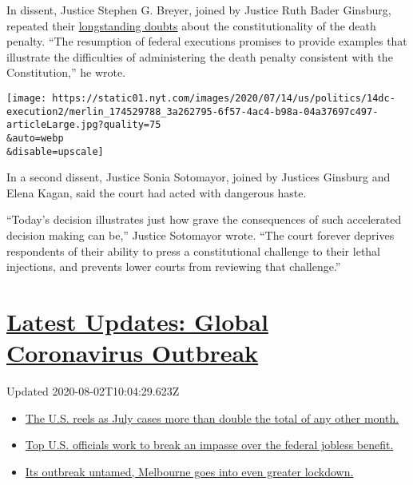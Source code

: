 In dissent, Justice Stephen G. Breyer, joined by Justice Ruth Bader
Ginsburg, repeated their
\href{https://www.nytimes.com/2015/11/04/us/politics/death-penalty-opponents-split-over-taking-issue-to-supreme-court.html}{longstanding
doubts} about the constitutionality of the death penalty. ``The
resumption of federal executions promises to provide examples that
illustrate the difficulties of administering the death penalty
consistent with the Constitution,'' he wrote.

\texttt{[image: https://static01.nyt.com/images/2020/07/14/us/politics/14dc-execution2/merlin\_174529788\_3a262795-6f57-4ac4-b98a-04a37697c497-articleLarge.jpg?quality=75\\\&auto=webp\\\&disable=upscale]}

In a second dissent, Justice Sonia Sotomayor, joined by Justices
Ginsburg and Elena Kagan, said the court had acted with dangerous haste.

``Today's decision illustrates just how grave the consequences of such
accelerated decision making can be,'' Justice Sotomayor wrote. ``The
court forever deprives respondents of their ability to press a
constitutional challenge to their lethal injections, and prevents lower
courts from reviewing that challenge.''

\hypertarget{latest-updates-global-coronavirus-outbreak}{%
\section{\texorpdfstring{\href{https://www.nytimes.com/2020/08/01/world/coronavirus-covid-19.html?action=click\&pgtype=Article\&state=default\&region=MAIN_CONTENT_1\&context=storylines_live_updates}{Latest
Updates: Global Coronavirus
Outbreak}}{Latest Updates: Global Coronavirus Outbreak}}\label{latest-updates-global-coronavirus-outbreak}}

Updated 2020-08-02T10:04:29.623Z

\begin{itemize}
\tightlist
\item
  \href{https://www.nytimes.com/2020/08/01/world/coronavirus-covid-19.html?action=click\&pgtype=Article\&state=default\&region=MAIN_CONTENT_1\&context=storylines_live_updates\#link-34047410}{The
  U.S. reels as July cases more than double the total of any other
  month.}
\item
  \href{https://www.nytimes.com/2020/08/01/world/coronavirus-covid-19.html?action=click\&pgtype=Article\&state=default\&region=MAIN_CONTENT_1\&context=storylines_live_updates\#link-780ec966}{Top
  U.S. officials work to break an impasse over the federal jobless
  benefit.}
\item
  \href{https://www.nytimes.com/2020/08/01/world/coronavirus-covid-19.html?action=click\&pgtype=Article\&state=default\&region=MAIN_CONTENT_1\&context=storylines_live_updates\#link-2bc8948}{Its
  outbreak untamed, Melbourne goes into even greater lockdown.}
\end{itemize}

